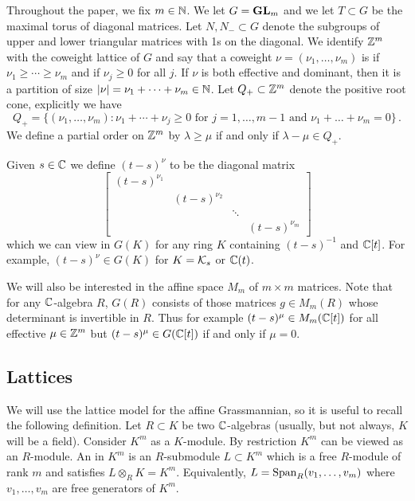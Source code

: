 \documentclass{article}
\begin{document}
Throughout the paper, we fix $ m \in \mathbb N$.  We let $G = {\mathbf{GL}}_m$ and we let $T\subset G$ be the maximal torus of diagonal matrices. Let $ N, N_- \subset G$ denote the subgroups of upper and lower triangular matrices with 1s on the diagonal. 
We identify $\mathbb Z^m$ with the coweight lattice of $G$ and say that a coweight $\nu = (\nu_1,\dots,\nu_m)$ is  if $\nu_1\ge\cdots\ge\nu_m$ and  if $\nu_j\ge 0$ for all $j$.
% 
If $\nu$ is both effective and dominant, then it is a partition of size $|\nu| = \nu_1 + \cdots + \nu_m\in\mathbb N$.  Let $ Q_+ \subset \mathbb Z^m$ denote the positive root cone, explicitly we have
$$
    Q_+ = \{ (\nu_1, \dots, \nu_m) : \nu_1 + \cdots + \nu_j \ge 0 \text{ for $j = 1, \dots, m-1 $ and } \nu_1 + \dots + \nu_m = 0 \}\,. 
$$
We define a partial order on $ \mathbb Z^m$ by $ \lambda \ge \mu $ if and only if $ \lambda - \mu \in Q_+ $.

Given $s\in\mathbb C$ we define $(t-s)^\nu$ to be the diagonal matrix 
\[
\begin{bmatrix}
    (t-s)^{\nu_1} \\
    & (t-s)^{\nu_2} \\ 
    & & \ddots \\
    & & & (t-s)^{\nu_m}
\end{bmatrix} 
\]
which we can view in $G(K)$ for any ring $ K $ containing $(t-s)^{-1}$ and $\mathbb C[t]$. For example, $(t-s)^\nu\in G(K)$ for $ K = \mathcal K_s$ or $\mathbb C(t)$.

We will also be interested in the affine space $ M_m$ of $m\times m$ matrices.  Note that for any $ \mathbb C$-algebra $ R $, $G(R)$ consists of those matrices $ g \in M_m(R) $ whose determinant is invertible in $ R$. Thus for example $ (t-s)^\mu\in M_m(\mathbb C[t])$ for all effective $ \mu \in \mathbb Z^m$ but $(t-s)^\mu\in G(\mathbb C[t])$ if and only if $ \mu = 0 $.
% 

\subsection{Lattices}
\label{ss:lat}
% 
We will use the lattice model for the affine Grassmannian, so it is useful to recall the following definition. Let $ R \subset K$ be two $\mathbb C$-algebras (usually, but not always, $K$ will be a field). 
Consider $ K^m $ as a $K$-module. By restriction $ K^m$ can be viewed as an $R$-module.  An  in $K^m$ is an $R$-submodule $ L \subset K^m$ which is a free $R$-module of rank $ m $ and satisfies $ L \otimes_R K = K^m $. Equivalently, $ L = \operatorname{Span}_R(v_1, \dots, v_m)$ where $v_1, \dots, v_m$ are free generators of $K^m$. 
% 
\end{document}
